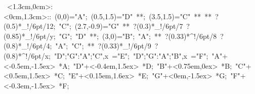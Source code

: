 %


\hbox{
\xy    <1.3cm,0cm>:<0cm,1.3cm>::
       (0,0)="A";  (0.5,1.5)="D" **\dir{-}; (3.5,1.5)="C" **\dir{-}
        **\dir{-} ?(0.5)*_!/6pt/{12}; "C";  
	 (2.7,-0.9)="G" **\dir{-} ?(0.3)*_!/6pt/{7} ?(0.85)*_!/6pt/{y}; 
	 "G"; "D" **\dir{-}; (3,0)="B"; "A"; **\dir{-} ?(0.33)*^!/6pt/{8} ?(0.8)*_!/6pt/{4}; 
       "A"; "C"; **\dir{-} ?(0.33)*_!/6pt/{9} ?(0.8)*^!/6pt/{x};   
	 {"D";"G":"A";"C",x} ="E";
	 {"D";"G":"A";"B",x} ="F";
       "A"+<-0.5em,-1.5ex> *{A};
       "D"+<-0.4em,1.5ex> *{D};
       "B"+<0.75em,0ex> *{B};
       "C"+<0.5em,1.5ex> *{C};
       "E"+<0.15em,1.6ex> *{E};
       "G"+<0em,-1.5ex> *{G};       "F"+<-0.3em,-1.5ex> *{F};
       \endxy}
	   
